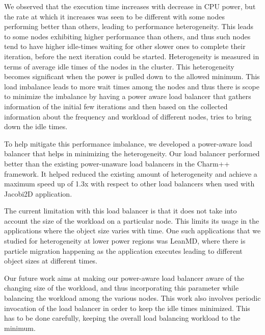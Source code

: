 We observed that the execution time increases with decrease in CPU power, but
the rate at which it increases was seen to be different with some nodes
performing better than others, leading to performance heterogeneity. This leads
to some nodes exhibiting higher performance than others, and thus such nodes
tend to have higher idle-times waiting for other slower ones to complete their
iteration, before the next iteration could be started. Heterogeneity is
measured in terms of average idle times of the nodes in the cluster. This
heterogeneity becomes significant when the power is pulled down to the allowed
minimum. This load imbalance leads to more wait times among the nodes and thus
there is scope to minimize the imbalance by having a power aware load balancer
that gathers information of the initial few iterations and then based on the
collected information about the frequency and workload of different nodes,
          tries to bring down the idle times.  
 
To help mitigate this performance imbalance, we developed a power-aware load
balancer that helps in minimizing the heterogeneity. Our load balancer
performed better than the existing power-unaware load balancers in the Charm++
framework. It helped reduced the existing amount of heterogeneity and achieve a
maximum speed up of 1.3x with respect to other load balancers when used with
Jacobi2D application. 


The current limitation with this load balancer is that it does not take into
account the size of the workload on a particular node. This limits its usage in
the applications where the object size varies with time. One such applications
that we studied for heterogeneity at lower power regions was LeanMD\cite{leanmd}, where
there is particle migration happening as the application executes leading to
different object sizes at different times. 

Our future work aims at making our power-aware load balancer aware of the
changing size of the workload, and thus incorporating this parameter while
balancing the workload among the various nodes. This work also involves
periodic invocation of the load balancer in order to keep the idle times
minimized. This has to be done carefully, keeping the overall load balancing
workload to the minimum.

